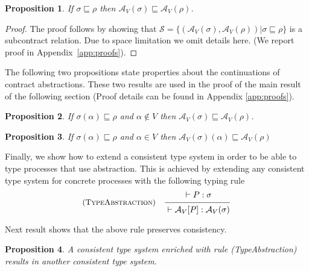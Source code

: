 \documentclass[submission,copyright,creativecommons]{eptcs}
\makeatletter
\def \mathrule #1#2#3{\begin{array}{l@{\quad}l}{\mbox{\small ({\sc #1})} }& \irule{#2}{#3}\end{array}}
\newcommand{\irule}[2]{\frac{\textstyle\rule[-1.3ex]{0cm}{3ex}#1}{\textstyle\rule[-.5ex]{0cm}{3ex}#2}}
\newtheorem{proposition}{Proposition}
\makeatother
\begin{document}
\begin{proposition} 
\label{prop:abstractionsubcontract}
If $\sigma \sqsubseteq \rho$ then  $\mathcal{A}_V(\sigma) \sqsubseteq \mathcal{A}_V(\rho)$.
\end{proposition}

\begin{proof}
The proof follows by showing that $\mathcal{S}= \{(\mathcal{A}_V(\sigma),\mathcal{A}_V(\rho)) | \sigma \sqsubseteq \rho\}$ is a subcontract relation. 
Due to space limitation we omit details here. (We report proof in Appendix~\ref{app:proofs}).
\end{proof}

The following two propositions state properties about the continuations of contract abstractions. These two results
are used in the proof of the main result of the following section (Proof details can be found in Appendix \ref{app:proofs}). 

\begin{proposition} 
\label{prop:abstractionsubcontracthiddenreduction}
If $\sigma(\alpha) \sqsubseteq \rho$ and $\alpha\not\in V$ then  $\mathcal{A}_V(\sigma) \sqsubseteq \mathcal{A}_V(\rho)$.
\end{proposition}

\begin{proposition} 
\label{prop:abstractionsubcontractvisiblereduction}
If $\sigma(\alpha) \sqsubseteq \rho$ and $\alpha\in V$ then  $\mathcal{A}_V(\sigma)(\alpha) \sqsubseteq \mathcal{A}_V(\rho)$
\end{proposition}



Finally, we show how to extend a consistent type system in order to be able to type processes that use abstraction. 
This is achieved by extending any consistent type system for concrete processes with the following typing rule 
\[
   \mathrule{TypeAbstraction}{\vdash P : \sigma}{\vdash\mathcal{A}_V[P] : \mathcal{A}_V(\sigma)}
\]

Next result shows that the above rule preserves consistency. 

\begin{proposition} \label{prop:enrichedconsistency} A consistent type system enriched with rule {\sc(TypeAbstraction)}
results in another consistent type system.
\end{proposition}
\end{document}
